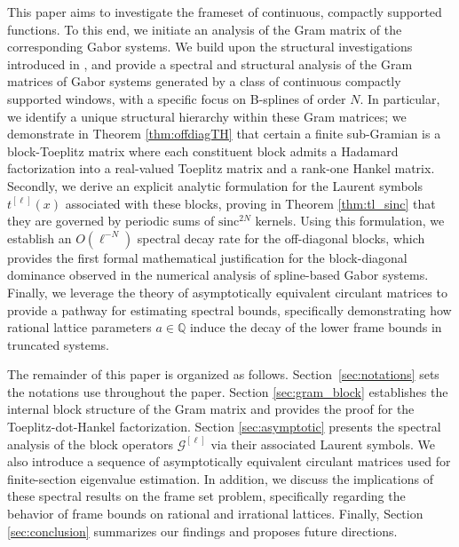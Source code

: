\documentclass{article}
\begin{document}
This paper aims to investigate the frameset of continuous, compactly supported functions. To this end, we initiate an analysis of the Gram matrix of the corresponding Gabor systems.
We build upon the structural investigations introduced in \cite{buckspectral}, and provide a spectral and structural analysis of the Gram matrices of Gabor systems generated by a class of continuous compactly supported windows, with a specific focus on B-splines of order $N$. In particular, we identify a unique structural hierarchy within these Gram matrices; we demonstrate in Theorem \ref{thm:offdiagTH} that certain a finite sub-Gramian  is a block-Toeplitz matrix where each constituent block admits a Hadamard factorization into a real-valued Toeplitz matrix and a rank-one Hankel matrix. Secondly, we derive an explicit analytic formulation for the Laurent symbols $t^{[\ell]}(x)$ associated with these blocks, proving in Theorem \ref{thm:tl_sinc} that they are governed by periodic sums of $\text{sinc}^{2N}$ kernels. Using this formulation, we establish an $O(\ell^{-N})$ spectral decay rate for the off-diagonal blocks, which provides the first formal mathematical justification for the block-diagonal dominance observed in the numerical analysis of spline-based Gabor systems. Finally, we leverage the theory of asymptotically equivalent circulant matrices to provide a pathway for estimating spectral bounds, specifically demonstrating how rational lattice parameters $a \in \mathbb{Q}$ induce the decay of the lower frame bounds in truncated systems.

The remainder of this paper is organized as follows. Section~\ref{sec:notations} sets the notations use throughout the paper. Section \ref{sec:gram_block} establishes the internal block structure of the Gram matrix and provides the proof for the Toeplitz-dot-Hankel factorization. Section \ref{sec:asymptotic} presents the spectral analysis of the block operators $\mathscr{G}^{[\ell]}$ via their associated Laurent symbols. We also introduce a sequence of asymptotically equivalent circulant matrices used for finite-section eigenvalue estimation. In addition, we discuss the implications of these spectral results on the frame set problem, specifically regarding the behavior of frame bounds on rational and irrational lattices. Finally, Section \ref{sec:conclusion} summarizes our findings and proposes future directions.
\end{document}
